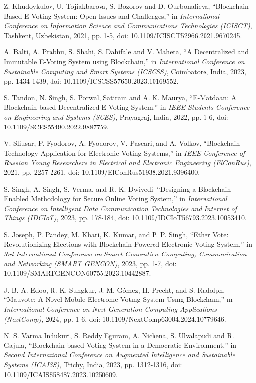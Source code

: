 \documentclass[conference]{IEEEtran}
\begin{document}
\begin{thebibliography}{8}
Z. Khudoykulov, U. Tojiakbarova, S. Bozorov and D. Ourbonalieva, ``Blockchain Based E-Voting System: Open Issues and Challenges,'' in {\it International Conference on Information Science and Communications Technologies (ICISCT)}, Tashkent, Uzbekistan, 2021, pp. 1-5, doi: 10.1109/ICISCT52966.2021.9670245.

A. Balti, A. Prabhu, S. Shahi, S. Dahifale and V. Maheta, ``A Decentralized and Immutable E-Voting System using Blockchain,'' in {\it International Conference on Sustainable Computing and Smart Systems (ICSCSS)}, Coimbatore, India, 2023, pp. 1434-1439, doi: 10.1109/ICSCSS57650.2023.10169552.

S. Tandon, N. Singh, S. Porwal, Satiram and A. K. Maurya, ``E-Matdaan: A Blockchain based Decentralized E-Voting System,'' in {\it IEEE Students Conference on Engineering and Systems (SCES)}, Prayagraj, India, 2022, pp. 1-6, doi: 10.1109/SCES55490.2022.9887759.

V. Sliusar, P. Fyodorov, A. Fyodorov, V. Pascari, and A. Volkov, ``Blockchain Technology Application for Electronic Voting Systems,'' in {\it IEEE Conference of Russian Young Researchers in Electrical and Electronic Engineering (ElConRus)}, 2021, pp. 2257-2261, doi: 10.1109/ElConRus51938.2021.9396400.

S. Singh, A. Singh, S. Verma, and R. K. Dwivedi, ``Designing a Blockchain-Enabled Methodology for Secure Online Voting System,'' in {\it International Conference on Intelligent Data Communication Technologies and Internet of Things (IDCIoT)}, 2023, pp. 178-184, doi: 10.1109/IDCIoT56793.2023.10053410.

S. Joseph, P. Pandey, M. Khari, K. Kumar, and P. P. Singh, ``Ether Vote: Revolutionizing Elections with Blockchain-Powered Electronic Voting System,'' in {\it 3rd International Conference on Smart Generation Computing, Communication and Networking (SMART GENCON)}, 2023, pp. 1-7, doi: 10.1109/SMARTGENCON60755.2023.10442887.

J. B. A. Edoo, R. K. Sungkur, J. M. Gómez, H. Precht, and S. Rudolph, ``Mauvote: A Novel Mobile Electronic Voting System Using Blockchain,'' in {\it International Conference on Next Generation Computing Applications (NextComp)}, 2024, pp. 1-6, doi: 10.1109/NextComp63004.2024.10779646.

N. S. Varma Indukuri, S. Reddy Eguram, A. Nichena, S. Ulvalapudi and R. Gajula, ``Blockchain-based Voting System in a Democratic Environment,'' in {\it Second International Conference on Augmented Intelligence and Sustainable Systems (ICAISS)}, Trichy, India, 2023, pp. 1312-1316, doi: 10.1109/ICAISS58487.2023.10250609.
\end{thebibliography}
\end{document}
